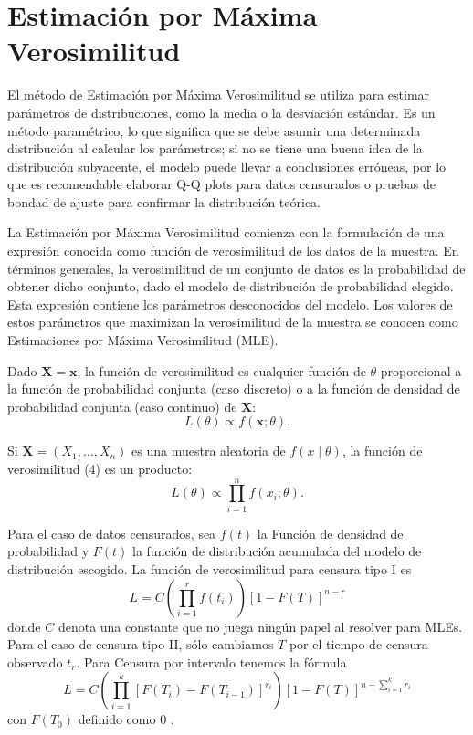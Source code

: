 \chapter*{Estimación por Máxima Verosimilitud}

El método de Estimación por Máxima Verosimilitud se utiliza para estimar parámetros de distribuciones, como la media o la desviación estándar. Es un método paramétrico, lo que significa que se debe asumir una determinada distribución al calcular los parámetros; si no se tiene una buena idea de la distribución subyacente, el modelo puede llevar a conclusiones erróneas, por lo que es recomendable elaborar Q-Q plots  para datos censurados o pruebas de bondad de ajuste para confirmar la distribución teórica.

La Estimación por Máxima Verosimilitud comienza con la formulación de una expresión conocida como función de verosimilitud de los datos de la muestra. En términos generales, la verosimilitud de un conjunto de datos es la probabilidad de obtener dicho conjunto, dado el modelo de distribución de probabilidad elegido. Esta expresión contiene los parámetros desconocidos del modelo. Los valores de estos parámetros que maximizan la verosimilitud de la muestra se conocen como Estimaciones por Máxima Verosimilitud (MLE).

Dado $\mathbf{X}=\mathbf{x}$, la función de verosimilitud
es cualquier función de $\theta$ proporcional a la función
de probabilidad conjunta (caso discreto) o a la función de
densidad de probabilidad conjunta (caso continuo) de
$\mathbf{X}$:
\begin{equation}
    L(\theta) \propto f(\mathbf{x};\theta).
    \tag{4}
\end{equation}
 
Si $\mathbf{X}=(X_1,\ldots,X_n)$ es una muestra aleatoria
de $f(x\mid\theta)$, la función de verosimilitud (4)
es un producto:
\begin{equation}
    L(\theta) \propto \prod_{i=1}^{n} f(x_i;\theta).
    \tag{5}
\end{equation} \cite{Lindgren1993} 

Para el caso de datos censurados, sea $f(t)$ la Función de densidad de probabilidad y $F(t)$ la función de distribución acumulada del modelo de distribución escogido. La función de verosimilitud para censura tipo I es $$L=C\left ( \prod_{i=1}^{r} f(t_i) \right )[1-F(T)]^{n-r}$$ donde $C$ denota una constante que no juega ningún papel al resolver para MLEs. Para el caso de censura tipo II, sólo cambiamos $T$ por el tiempo de censura observado $t_r$. Para Censura por intervalo tenemos la fórmula $$L=C\left ( \prod_{i=1}^{k} [F(T_i)-F(T_{i-1})]^{r_i} \right )[1-F(T)]^{n-\sum_{i=1}^{k}r_i}$$ con $F(T_0)$ definido como 0 \cite{NIST_Handbook_Chapter_MLE}. 

